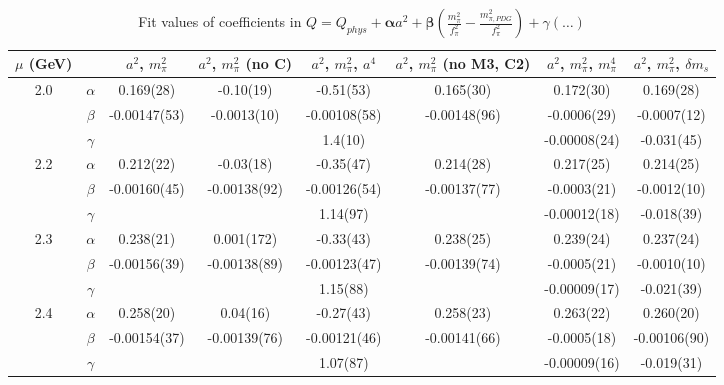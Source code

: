 \documentclass[12pt]{extarticle}
\begin{document}
\begin{table}[h!]
\begin{center}
\begin{tabular}{|c c|c|c|c|c|c|c|}
\hline
$\mu$ (GeV) &  & $a^2$, $m_\pi^2$& $a^2$, $m_\pi^2$ (no C)& $a^2$, $m_\pi^2$, $a^4$& $a^2$, $m_\pi^2$ (no M3, C2)& $a^2$, $m_\pi^2$, $m_\pi^4$& $a^2$, $m_\pi^2$, $\delta m_s$\\
\hline
\multirow{3}{0.5in}{2.0} & $\alpha$ & 0.169(28)& -0.10(19)& -0.51(53)& 0.165(30)& 0.172(30)& 0.169(28)\\
 & $\beta$ & -0.00147(53)& -0.0013(10)& -0.00108(58)& -0.00148(96)& -0.0006(29)& -0.0007(12)\\
 & $\gamma$ &  &  & 1.4(10)&  & -0.00008(24)& -0.031(45)\\
\hline
\multirow{3}{0.5in}{2.2} & $\alpha$ & 0.212(22)& -0.03(18)& -0.35(47)& 0.214(28)& 0.217(25)& 0.214(25)\\
 & $\beta$ & -0.00160(45)& -0.00138(92)& -0.00126(54)& -0.00137(77)& -0.0003(21)& -0.0012(10)\\
 & $\gamma$ &  &  & 1.14(97)&  & -0.00012(18)& -0.018(39)\\
\hline
\multirow{3}{0.5in}{2.3} & $\alpha$ & 0.238(21)& 0.001(172)& -0.33(43)& 0.238(25)& 0.239(24)& 0.237(24)\\
 & $\beta$ & -0.00156(39)& -0.00138(89)& -0.00123(47)& -0.00139(74)& -0.0005(21)& -0.0010(10)\\
 & $\gamma$ &  &  & 1.15(88)&  & -0.00009(17)& -0.021(39)\\
\hline
\multirow{3}{0.5in}{2.4} & $\alpha$ & 0.258(20)& 0.04(16)& -0.27(43)& 0.258(23)& 0.263(22)& 0.260(20)\\
 & $\beta$ & -0.00154(37)& -0.00139(76)& -0.00121(46)& -0.00141(66)& -0.0005(18)& -0.00106(90)\\
 & $\gamma$ &  &  & 1.07(87)&  & -0.00009(16)& -0.019(31)\\
\hline
\end{tabular}
\caption{Fit values of coefficients in $Q = Q_{phys} + \mathbf{\alpha} a^2 + \mathbf{\beta}\left(\frac{m_\pi^2}{f_\pi^2}-\frac{m_{\pi,PDG}^2}{f_\pi^2}\right) + \gamma(\ldots)$}
\end{center}
\end{table}






\end{document}
